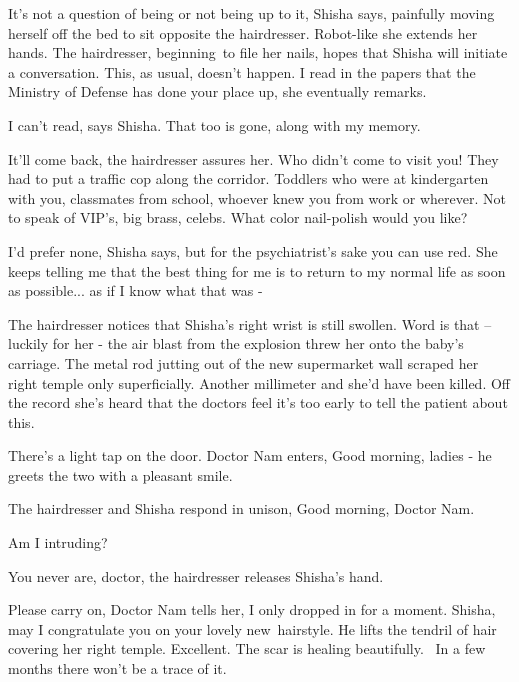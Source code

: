 \documentclass[12pt]{book}
\begin{document}
{\textquotedbl}It's not a question of being or not being up to it,{\textquotedbl} Shisha says, painfully{
}moving herself off the bed to sit opposite the hairdresser. Robot-like she extends her hands. The hairdresser,
beginning~to file her nails, hopes that Shisha will initiate a conversation. This, as usual, doesn't happen.
{\textquotedbl}I read in the papers that the Ministry of Defense has done your place up,{\textquotedbl} she eventually
remarks.

{\textquotedbl}I can't read,{\textquotedbl} says Shisha. {\textquotedbl}That too is gone, along with my
memory.{\textquotedbl}

{\textquotedbl}It'll come back,{\textquotedbl} the hairdresser assures her. {\textquotedbl}Who didn't come to visit you!
They had to put a traffic cop along the corridor. Toddlers who were at kindergarten with you, classmates from school,
whoever knew you from work or wherever. Not to speak of VIP's, big brass, celebs. What color nail-polish would you
like? {\textquotedbl}

{\textquotedbl}I'd{ }prefer none,{\textquotedbl} Shisha says, {\textquotedbl}but
for the psychiatrist's sake you can use red. She keeps telling me that the best thing for me is to return to my normal
life as soon as possible... as if I know what that was -{\textquotedbl} ~

The hairdresser notices that Shisha's right wrist is still swollen. Word is that -- luckily for her - the air blast from
the explosion threw her onto the baby's carriage. The metal rod jutting out of the new supermarket wall scraped her
right temple only superficially. Another millimeter and she'd have been killed. Off the record she's heard that the
doctors feel it's too early to tell the patient about this.

There's a light tap on the door. Doctor Nam enters, {\textquotedbl}Good morning, ladies -{\textquotedbl} he greets the
two with a pleasant smile.

The hairdresser and Shisha respond in unison, {\textquotedbl}Good morning, Doctor Nam.{\textquotedbl}

{\textquotedbl}Am I intruding?{\textquotedbl}

{\textquotedbl}You never are, doctor,{\textquotedbl} the hairdresser releases Shisha's hand.

{\textquotedbl}Please carry on,{\textquotedbl} Doctor Nam tells her, {\textquotedbl}I only dropped in for a moment.
Shisha, may I congratulate you on your lovely new~hairstyle.{\textquotedbl} He lifts the tendril of hair covering her
right temple. {\textquotedbl}Excellent. The scar is healing beautifully. ~In a few months there won't be a trace of
it.{\textquotedbl}
\end{document}
